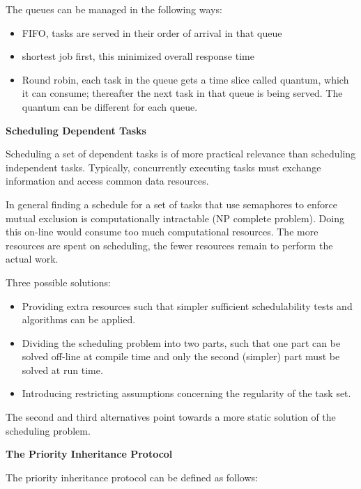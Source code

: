 The queues can be managed in the following ways:

\begin{itemize}
\item
  FIFO, tasks are served in their order of arrival in that queue
\item
  shortest job first, this minimized overall response time
\item
  Round robin, each task in the queue gets a time slice called quantum,
  which it can consume; thereafter the next task in that queue is being
  served. The quantum can be different for each queue.
\end{itemize}

\textbf{Scheduling Dependent Tasks}

Scheduling a set of dependent tasks is of more practical relevance than
scheduling independent tasks. Typically, concurrently executing tasks
must exchange information and access common data resources.

In general finding a schedule for a set of tasks that use semaphores to
enforce mutual exclusion is computationally intractable (NP complete
problem). Doing this on-line would consume too much computational
resources. The more resources are spent on scheduling, the fewer
resources remain to perform the actual work.

Three possible solutions:

\begin{itemize}
\item
  Providing extra resources such that simpler sufficient schedulability
  tests and algorithms can be applied.
\item
  Dividing the scheduling problem into two parts, such that one part can
  be solved off-line at compile time and only the second (simpler) part
  must be solved at run time.
\item
  Introducing restricting assumptions concerning the regularity of the
  task set.
\end{itemize}

The second and third alternatives point towards a more static solution
of the scheduling problem.

\textbf{The Priority Inheritance Protocol}

The priority inheritance protocol can be defined as follows:

